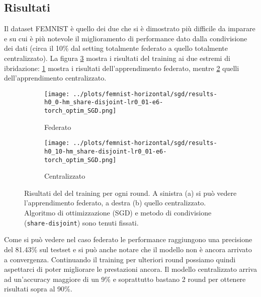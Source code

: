 \subsection{Risultati}
Il dataset FEMNIST è quello dei due che si è dimostrato più difficile 
da imparare e su cui è più notevole il miglioramento di performance 
dato dalla condivisione dei dati (circa il 10\% dal setting totalmente
federato a quello totalmente centralizzato). La figura \ref{fig:femnistrandom}
mostra i risultati del training ai due estremi di ibridazione:
\ref{fig:femnistrandoma} mostra i risultati dell'apprendimento federato,
mentre \ref{fig:femnistrandomb} quelli dell'apprendimento centralizzato.
\begin{figure}[hb]  %
    \centering
    \begin{subfigure}[b]{0.49\textwidth}
        \centering
        \texttt{[image: ../plots/femnist-horizontal/sgd/results-h0\_0-hm\_share-disjoint-lr0\_01-e6-torch\_optim\_SGD.png]}
        \caption{Federato}
        \label{fig:femnistrandoma}
    \end{subfigure}
    \hfill
    \begin{subfigure}[b]{0.49\textwidth}
        \centering
        \texttt{[image: ../plots/femnist-horizontal/sgd/results-h0\_10-hm\_share-disjoint-lr0\_01-e6-torch\_optim\_SGD.png]}
        \caption{Centralizzato}
        \label{fig:femnistrandomb}
    \end{subfigure}
    
    \caption{
        Risultati del del training per ogni round. A sinistra (a) si può 
        vedere l'apprendimento federato, a destra (b) quello centralizzato.
        Algoritmo di ottimizzazione (SGD) e metodo di condivisione 
        (\texttt{share-disjoint}) sono tenuti fissati.
    }
    \label{fig:femnistrandom}
\end{figure}


Come si può vedere nel caso federato 
le performance raggiungono una precisione del 81.43\% sul testset 
e si può anche notare che il modello non è ancora arrivato a convergenza.
Continuando il training per ulteriori round possiamo quindi aspettarci 
di poter migliorare le prestazioni ancora.
Il modello centralizzato arriva ad un'accuracy maggiore di un 9\% e 
soprattutto bastano 2 round per ottenere risultati sopra al 90\%.

